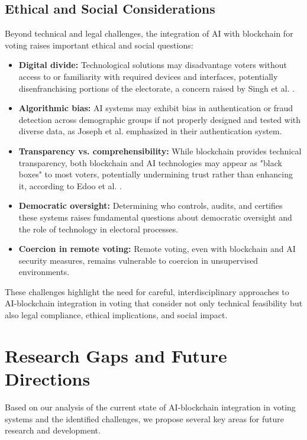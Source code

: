 \documentclass[conference]{IEEEtran}
\begin{document}
\subsection{Ethical and Social Considerations}
Beyond technical and legal challenges, the integration of AI with blockchain for voting raises important ethical and social questions:

\begin{itemize}
    \item \textbf{Digital divide:} Technological solutions may disadvantage voters without access to or familiarity with required devices and interfaces, potentially disenfranchising portions of the electorate, a concern raised by Singh et al. \cite{b7}.
    
    \item \textbf{Algorithmic bias:} AI systems may exhibit bias in authentication or fraud detection across demographic groups if not properly designed and tested with diverse data, as Joseph et al. \cite{b8} emphasized in their authentication system.
    
    \item \textbf{Transparency vs. comprehensibility:} While blockchain provides technical transparency, both blockchain and AI technologies may appear as "black boxes" to most voters, potentially undermining trust rather than enhancing it, according to Edoo et al. \cite{b9}.
    
    \item \textbf{Democratic oversight:} Determining who controls, audits, and certifies these systems raises fundamental questions about democratic oversight and the role of technology in electoral processes.
    
    \item \textbf{Coercion in remote voting:} Remote voting, even with blockchain and AI security measures, remains vulnerable to coercion in unsupervised environments.
\end{itemize}

These challenges highlight the need for careful, interdisciplinary approaches to AI-blockchain integration in voting that consider not only technical feasibility but also legal compliance, ethical implications, and social impact.

\section{Research Gaps and Future Directions}
Based on our analysis of the current state of AI-blockchain integration in voting systems and the identified challenges, we propose several key areas for future research and development.
\end{document}
